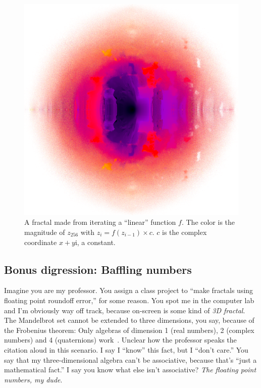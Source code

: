 \documentclass[twocolumn]{article}
\begin{document}
\begin{figure}[tp]
  \begin{center}
    \includegraphics[width=0.95 \linewidth]{perm16frac}
  \end{center}
  \caption{
    A fractal made from iterating a ``linear'' function $f$. The color
    is the magnitude of $z_{256}$ with $z_i = f(z_{i-1}) \times c$.
    $c$ is the complex coordinate $x + y\mathrm{i}$, a constant.
  } \label{fig:perm16frac}
\end{figure}

\subsection{Bonus digression: Baffling numbers}
Imagine you are my professor. You assign a class project to ``make
fractals using floating point roundoff error,'' for some reason. You
spot me in the computer lab and I'm obviously way off track, because
on-screen is some kind of {\Large \it 3D fractal}. The Mandelbrot set cannot
be extended to three dimensions, you say, because of the Frobenius
theorem: Only algebras of dimension 1 (real numbers), 2 (complex
numbers) and 4 (quaternions) work~\cite{frobenius1878lineare}. Unclear
how the professor speaks the citation aloud in this scenario. I say I
``know'' this fact, but I ``don't care.'' You say that my
three-dimensional algebra can't be associative, because that's ``just
a mathematical fact.'' I say you know what else isn't associative?
{\em The floating point numbers, my dude}.
\end{document}
